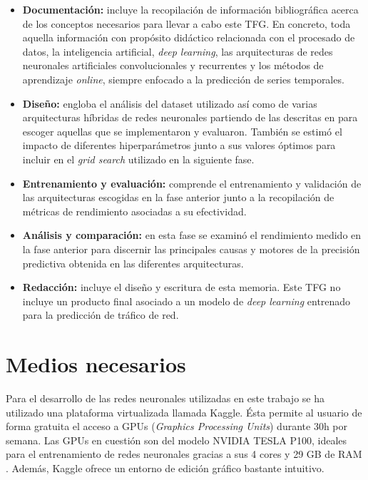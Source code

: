 \begin{itemize}
	\item \textbf{Documentación:} incluye la recopilación de información bibliográfica acerca de los conceptos necesarios para llevar a cabo este TFG. En concreto, toda aquella información con propósito didáctico relacionada con el procesado de datos, la inteligencia artificial, \textit{deep learning}, las arquitecturas de redes neuronales artificiales convolucionales y recurrentes y los métodos de aprendizaje \textit{online}, siempre enfocado a la predicción de series temporales.
	
	\item  \textbf{Diseño:} engloba el análisis del dataset utilizado así como de varias arquitecturas híbridas de redes neuronales partiendo de las descritas en \cite{SKIMAcasaseca,tfgalicia} para escoger aquellas que se implementaron y evaluaron. También se estimó el impacto de diferentes hiperparámetros junto a sus valores óptimos para incluir en el \textit{grid search} utilizado en la siguiente fase.
	
	\item \textbf{Entrenamiento y evaluación:} comprende el entrenamiento y validación de las arquitecturas escogidas en la fase anterior junto a la recopilación de métricas de rendimiento asociadas a su efectividad.
	
	\item \textbf{Análisis y comparación:} en esta fase se examinó el rendimiento medido en la fase anterior para discernir las principales causas y motores de la precisión predictiva obtenida en las diferentes arquitecturas.
	
	\item \textbf{Redacción:} incluye el diseño y escritura de esta memoria. Este TFG no incluye un producto final asociado a un modelo de \textit{deep learning} entrenado para la predicción de tráfico de red.
\end{itemize}

\section{Medios necesarios}
Para el desarrollo de las redes neuronales utilizadas en este trabajo se ha utilizado una plataforma virtualizada llamada Kaggle. Ésta permite al usuario de forma gratuita el acceso a GPUs (\textit{Graphics Processing Units}) durante 30h por semana. Las GPUs en cuestión son del modelo NVIDIA TESLA P100, ideales para el entrenamiento de redes neuronales gracias a sus 4 cores y 29 GB de RAM \cite{gpup100}. Además, Kaggle ofrece un entorno de edición gráfico bastante intuitivo.

